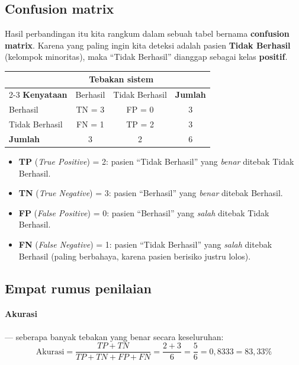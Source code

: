 \documentclass[11pt,a4paper]{article}
\begin{document}
\subsection{Confusion matrix}

Hasil perbandingan itu kita rangkum dalam sebuah tabel bernama \textbf{confusion matrix}. Karena
yang paling ingin kita deteksi adalah pasien \textbf{Tidak Berhasil} (kelompok minoritas),
maka ``Tidak Berhasil'' dianggap sebagai kelas \textbf{positif}.

\begin{center}
\begin{tabular}{lccc}
\toprule
& \multicolumn{2}{c}{\textbf{Tebakan sistem}} & \\
\cmidrule(lr){2-3}
\textbf{Kenyataan} & Berhasil & Tidak Berhasil & \textbf{Jumlah} \\
\midrule
Berhasil        & \textcolor{hijau}{TN = 3} & FP = 0 & 3 \\
Tidak Berhasil  & \textcolor{merah}{FN = 1} & \textcolor{hijau}{TP = 2} & 3 \\
\midrule
\textbf{Jumlah} & 3 & 2 & 6 \\
\bottomrule
\end{tabular}
\end{center}

\begin{itemize}[leftmargin=*]
  \item \textbf{TP} (\emph{True Positive}) = 2: pasien ``Tidak Berhasil'' yang \emph{benar} ditebak Tidak Berhasil.
  \item \textbf{TN} (\emph{True Negative}) = 3: pasien ``Berhasil'' yang \emph{benar} ditebak Berhasil.
  \item \textbf{FP} (\emph{False Positive}) = 0: pasien ``Berhasil'' yang \emph{salah} ditebak Tidak Berhasil.
  \item \textbf{FN} (\emph{False Negative}) = 1: pasien ``Tidak Berhasil'' yang \emph{salah} ditebak Berhasil (paling berbahaya, karena pasien berisiko justru lolos).
\end{itemize}

\subsection{Empat rumus penilaian}

\paragraph{Akurasi} --- seberapa banyak tebakan yang benar secara keseluruhan:
\[ \text{Akurasi} = \frac{TP + TN}{TP + TN + FP + FN} = \frac{2+3}{6} = \frac{5}{6} = 0{,}8333 = 83{,}33\% \]
\end{document}
